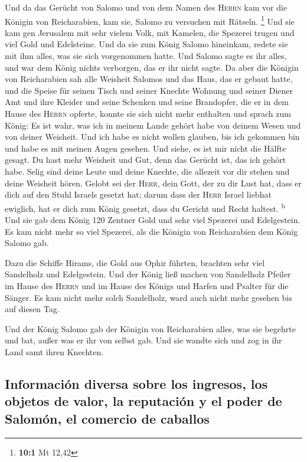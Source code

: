  Und da das Gerücht von Salomo und von dem Namen des
\textsc{Herrn} kam vor die Königin von Reicharabien, kam sie, Salomo zu
versuchen mit Rätseln. \footnote{\textbf{10:1} Mt 12,42} 
Und sie kam gen Jerusalem mit sehr vielem Volk, mit Kamelen, die
Spezerei trugen und viel Gold und Edelsteine. Und da sie zum König
Salomo hineinkam, redete sie mit ihm alles, was sie sich vorgenommen
hatte.  Und Salomo sagte es ihr alles, und war dem König
nichts verborgen, das er ihr nicht sagte.  Da aber die
Königin von Reicharabien sah alle Weisheit Salomos und das Haus, das er
gebaut hatte,  und die Speise für seinen Tisch und seiner
Knechte Wohnung und seiner Diener Amt und ihre Kleider und seine
Schenken und seine Brandopfer, die er in dem Hause des \textsc{Herrn}
opferte, konnte sie sich nicht mehr enthalten  und sprach
zum König: Es ist wahr, was ich in meinem Lande gehört habe von deinem
Wesen und von deiner Weisheit.  Und ich habe es nicht
wollen glauben, bis ich gekommen bin und habe es mit meinen Augen
gesehen. Und siehe, es ist mir nicht die Hälfte gesagt. Du hast mehr
Weisheit und Gut, denn das Gerücht ist, das ich gehört habe.
 Selig sind deine Leute und deine Knechte, die allezeit
vor dir stehen und deine Weisheit hören.  Gelobt sei der
\textsc{Herr}, dein Gott, der zu dir Lust hat, dass er dich auf den
Stuhl Israels gesetzt hat; darum dass der \textsc{Herr} Israel liebhat
ewiglich, hat er dich zum König gesetzt, dass du Gericht und Recht
haltest. \textsuperscript{b}  Und sie gab dem König 120
Zentner Gold und sehr viel Spezerei und Edelgestein. Es kam nicht mehr
so viel Spezerei, als die Königin von Reicharabien dem König Salomo gab.

 Dazu die Schiffe Hirams, die Gold aus Ophir führten,
brachten sehr viel Sandelholz und Edelgestein.  Und der
König ließ machen von Sandelholz Pfeiler im Hause des \textsc{Herrn} und
im Hause des Königs und Harfen und Psalter für die Sänger. Es kam nicht
mehr solch Sandelholz, ward auch nicht mehr gesehen bis auf diesen Tag.

 Und der König Salomo gab der Königin von Reicharabien
alles, was sie begehrte und bat, außer was er ihr von selbst gab. Und
sie wandte sich und zog in ihr Land samt ihren Knechten.

\hypertarget{informaciuxf3n-diversa-sobre-los-ingresos-los-objetos-de-valor-la-reputaciuxf3n-y-el-poder-de-salomuxf3n-el-comercio-de-caballos}{%
\subsection{Información diversa sobre los ingresos, los objetos de
valor, la reputación y el poder de Salomón, el comercio de
caballos}\label{informaciuxf3n-diversa-sobre-los-ingresos-los-objetos-de-valor-la-reputaciuxf3n-y-el-poder-de-salomuxf3n-el-comercio-de-caballos}}

